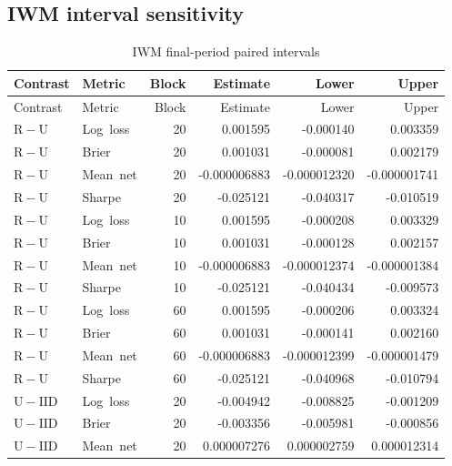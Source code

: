 \subsection{IWM interval sensitivity}
\begingroup\small\setlength{\tabcolsep}{10pt}\begin{longtable}{llrrrr}
\caption{IWM final-period paired intervals}\\
\toprule Contrast & Metric & Block & Estimate & Lower & Upper\\\midrule\endfirsthead
\toprule Contrast & Metric & Block & Estimate & Lower & Upper\\\midrule\endhead
\mbox{$\mathrm{R}-\mathrm{U}$} & \mbox{Log loss} & 20 & 0.001595 & -0.000140 & 0.003359\\
\mbox{$\mathrm{R}-\mathrm{U}$} & \mbox{Brier} & 20 & 0.001031 & -0.000081 & 0.002179\\
\mbox{$\mathrm{R}-\mathrm{U}$} & \mbox{Mean net} & 20 & -0.000006883 & -0.000012320 & -0.000001741\\
\mbox{$\mathrm{R}-\mathrm{U}$} & \mbox{Sharpe} & 20 & -0.025121 & -0.040317 & -0.010519\\
\mbox{$\mathrm{R}-\mathrm{U}$} & \mbox{Log loss} & 10 & 0.001595 & -0.000208 & 0.003329\\
\mbox{$\mathrm{R}-\mathrm{U}$} & \mbox{Brier} & 10 & 0.001031 & -0.000128 & 0.002157\\
\mbox{$\mathrm{R}-\mathrm{U}$} & \mbox{Mean net} & 10 & -0.000006883 & -0.000012374 & -0.000001384\\
\mbox{$\mathrm{R}-\mathrm{U}$} & \mbox{Sharpe} & 10 & -0.025121 & -0.040434 & -0.009573\\
\mbox{$\mathrm{R}-\mathrm{U}$} & \mbox{Log loss} & 60 & 0.001595 & -0.000206 & 0.003324\\
\mbox{$\mathrm{R}-\mathrm{U}$} & \mbox{Brier} & 60 & 0.001031 & -0.000141 & 0.002160\\
\mbox{$\mathrm{R}-\mathrm{U}$} & \mbox{Mean net} & 60 & -0.000006883 & -0.000012399 & -0.000001479\\
\mbox{$\mathrm{R}-\mathrm{U}$} & \mbox{Sharpe} & 60 & -0.025121 & -0.040968 & -0.010794\\
\mbox{$\mathrm{U}-\mathrm{IID}$} & \mbox{Log loss} & 20 & -0.004942 & -0.008825 & -0.001209\\
\mbox{$\mathrm{U}-\mathrm{IID}$} & \mbox{Brier} & 20 & -0.003356 & -0.005981 & -0.000856\\
\mbox{$\mathrm{U}-\mathrm{IID}$} & \mbox{Mean net} & 20 & 0.000007276 & 0.000002759 & 0.000012314\\

\end{longtable}
